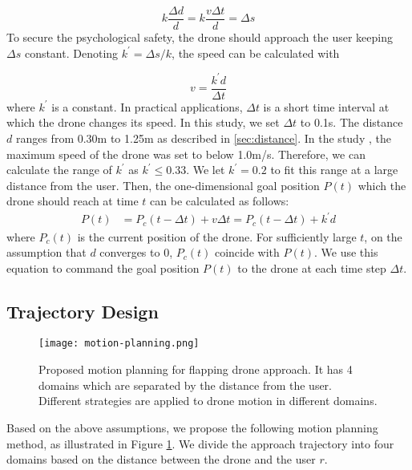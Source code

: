 \begin{equation}
    \label{eq:weber}
    k{\frac{\Delta d}{d}} = k{\frac{v\Delta t}{d}}=\Delta s
\end{equation}
To secure the psychological safety, the drone should approach the user keeping $\Delta s$ constant.
Denoting $k^\prime = {\Delta s/k}$, the speed can be calculated with

\begin{equation}
    v = {\frac{k^\prime d}{\Delta t}}
    \label{eq:speed}
\end{equation}
where $k^\prime$ is a constant.
In practical applications, $\Delta t$ is a short time interval at which the drone changes its speed. 
In this study, we set $\Delta t$ to 0.1s.
The distance $d$ ranges from 0.30m to 1.25m as described in \ref{sec:distance}.
In the study \cite{lieser2021evaluating-distances}, the maximum speed of the drone was set to below 1.0m/s.
Therefore, we can calculate the range of $k^\prime$ as $k^\prime \le 0.33$.  
We let $k^\prime = 0.2$ to fit this range at a large distance from the user.
Then, the one-dimensional goal position $P(t)$ which the drone should reach at time $t$ can be calculated as follows:
\begin{equation}
    \begin{aligned}    
        P(t) &= P_c(t-\Delta t) + v\Delta t = P_c(t-\Delta t) + k^\prime d
    \label{eq:goal}
    \end{aligned}
\end{equation}
where $P_c(t)$ is the current position of the drone.
For sufficiently large $t$, on the assumption that $d$ converges to 0, $P_c(t)$ coincide with $P(t)$. 
We use this equation to command the goal position $P(t)$ to the drone at each time step $\Delta t$.

\subsection{Trajectory Design}
\label{sec:trajectory}

\begin{figure}[t]
    \centering
    \texttt{[image: motion-planning.png]}
    \caption{Proposed motion planning for flapping drone approach. It has 4 domains which are separated by the distance from the user. Different strategies are applied to drone motion in different domains.
    }
    \label{fig:trajectory}
\end{figure}

Based on the above assumptions, we propose the following motion planning method, as illustrated in Figure \ref{fig:trajectory}.
We divide the approach trajectory into four domains based on the distance between the drone and the user $r$.

